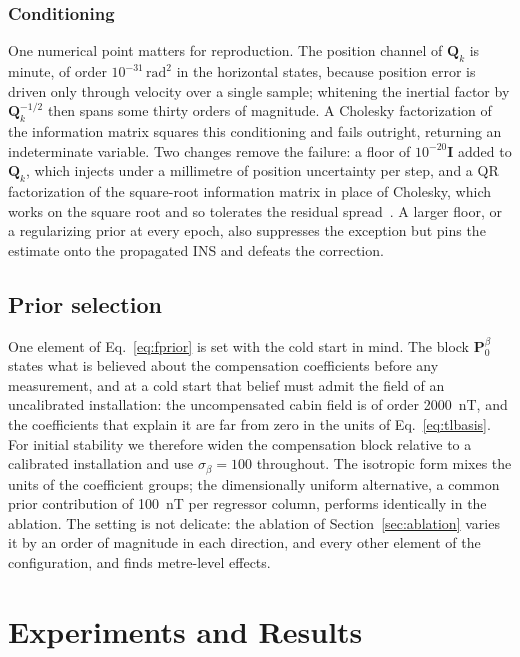 \documentclass{IEEEtaes}
\begin{document}
\subsubsection{Conditioning}
One numerical point matters for reproduction. The position channel of
$\mathbf{Q}_k$ is minute, of order $10^{-31}\,\mathrm{rad}^2$ in the horizontal
states, because position error is driven only through velocity over a single
sample; whitening the inertial factor by $\mathbf{Q}_k^{-1/2}$ then spans some
thirty orders of magnitude. A Cholesky factorization of the information matrix
squares this conditioning and fails outright, returning an indeterminate
variable. Two changes remove the failure: a floor of $10^{-20}\mathbf{I}$ added
to $\mathbf{Q}_k$, which injects under a millimetre of position uncertainty per
step, and a QR factorization of the square-root
information matrix in place of Cholesky, which works on the square root and so
tolerates the residual spread~\cite{dellaert2006}. A larger floor, or a
regularizing prior at every epoch, also suppresses the exception but pins the
estimate onto the propagated INS and defeats the correction.

\subsection{Prior selection}\label{sec:coldprior}
One element of Eq.~\eqref{eq:fprior} is set with the cold start in mind. The block
$\mathbf{P}_0^{\beta}$ states what is believed about the compensation
coefficients before any measurement, and at a cold start that belief must admit
the field of an uncalibrated installation: the uncompensated cabin field is of
order \SI{2000}{\nano\tesla}, and the coefficients that explain it are far from
zero in the units of Eq.~\eqref{eq:tlbasis}. For initial stability we therefore
widen the compensation block relative to a calibrated installation and use
$\sigma_{\beta}=100$ throughout. The isotropic form mixes the units of the
coefficient groups; the dimensionally uniform alternative, a common prior
contribution of \SI{100}{\nano\tesla} per regressor column, performs
identically in the ablation. The setting is not delicate: the ablation of
Section~\ref{sec:ablation} varies it by an order of magnitude in each direction,
and every other element of the configuration, and finds metre-level effects.

\section{Experiments and Results}\label{sec:results}
\end{document}
